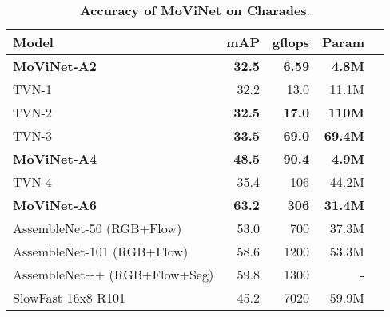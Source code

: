 \documentclass[final]{cvpr}
\newcommand{\ournet}{MoViNet\xspace} \newcommand{\ournets}{\ournet{}s\xspace}
\begin{document}
\begin{table}[tbp]
    \footnotesize
    \begin{center}
    \begin{tabularx}{\columnwidth}{@{}Xrrrr@{}}
    \toprule
        \sc Model & \sc mAP & \sc gflops & \sc Param \\
    \midrule
        \bf \ournet-A2 & \bf 32.5 & \bf 6.59 & \bf 4.8M \\
        TVN-1 \cite{piergiovanni2020tiny} & 32.2 & 13.0 & 11.1M \\
    \midrule
        TVN-2 \cite{piergiovanni2020tiny} & \bf 32.5 & \bf 17.0 & \bf 110M \\
    \midrule
        TVN-3 \cite{piergiovanni2020tiny} & \bf 33.5 & \bf 69.0 & \bf 69.4M \\
    \midrule
        \bf \ournet-A4 & \bf 48.5 & \bf 90.4 & \bf 4.9M \\
        TVN-4 \cite{piergiovanni2020tiny} & 35.4 & 106 & 44.2M \\
    \midrule
        \bf \ournet-A6 & \bf 63.2 & \bf 306 & \bf 31.4M \\
        AssembleNet-50 (RGB+Flow) \cite{ryoo2019assemblenet} & 53.0 & 700 & 37.3M \\
        AssembleNet-101 (RGB+Flow) \cite{ryoo2019assemblenet} & 58.6 & 1200 & 53.3M \\
        AssembleNet++ (RGB+Flow+Seg)\cite{ryoo2020assemblenetpp} & 59.8 & 1300 & - \\
        SlowFast 16x8 R101 \cite{feichtenhofer2019slowfast} & 45.2 & 7020 & 59.9M \\
    \bottomrule
    \end{tabularx}
    \end{center}
    \caption{
        {\bf Accuracy of \ournet on Charades}.
    }
    \label{table:charades-comparison}
\end{table}
\end{document}
